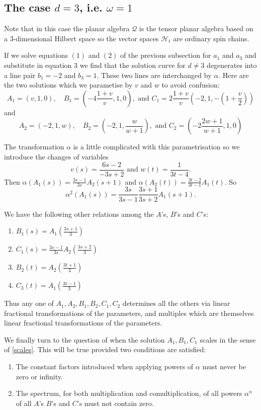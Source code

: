 \documentclass[11pt]{amsart}
\newcommand{\1}{\mathcal I}
\newcommand{\5}{\vskip 5pt}
\begin{document}
\subsection{The case $d=3$, i.e.  $\omega=1$}  Note that in this case the planar algebra $\mathcal Q$ is the tensor
planar algebra based on a 3-dimensional Hilbert space so the vector spaces $\mathcal H_t$ are ordinary spin chains.

If we solve equations $(1)$ and $(2)$ of the previous subsection for $a_1$ and $a_3$ and substitute in equation $3$ we
find that the solution curve for $d\neq 3$ degenerates into a line pair $b_1=-2$ and $b_3=1$. These two lines are 
interchanged by $\alpha$. Here are the two solutions which we parametise by $v$ and $w$ to avoid confusion:\\
$$A_1=(v,1,0),\quad B_1=(-4\frac{1+v}{v},1,0), \mbox{    and    } C_1=2\frac{1+v}{v}(-2,1,-(1+\frac{v}{2}))$$
and
$$A_2=(-2,1,w),\quad B_2=(-2,1,\frac{w}{w+1}), \mbox{    and    } C_2=(-2\frac{2w+1}{w+1},1,0)$$

The transformation $\alpha$ is a little complicated with this parametrisation so we introduce the changes of 
variables $$v(s)=\frac{6s-2}{-3s+2}\mbox{  and  } w(t)=\frac{1}{3t-4}.$$
Then $\displaystyle \alpha(A_1(s))=\frac{3s-1}{3s}A_2(s+1)$ and $\displaystyle \alpha(A_2(t))=\frac{3t-2}{3t-1}A_1(t)$.
So $$\alpha^2(A_1(s))=\frac{3s}{3s-1}\frac{3s+1}{3s+2}A_1(s+1).$$

We have the following other relations among the $A$'s, $B$'s and $C$'s:

\begin{enumerate}
\item $\displaystyle B_1(s)=A_1(\frac{3s+1}{3})$
\5
\item $\displaystyle C_1(s)=\frac{3s-1}{3s}A_2(\frac{3s+2}{3})$
\5
\item $\displaystyle B_2(t)=A_2(\frac{3t+1}{3})$
\5
\item $\displaystyle C_3(t)=A_1(\frac{3t-1}{3})$
\end{enumerate}

Thus any one of $A_1,A_2,B_1,B_2,C_1,C_2$ determines all the others via linear fractional transformations of
the parameters, and multiples which are themselves linear fractional transformations of the parameters. 

We finally turn to the question of when the solution $A_1,B_1,C_1$ scales in the sense of
\ref{scales}. This will be true provided two conditions are satisfied:
\begin{enumerate}
\item The constant factors introduced when applying powers of $\alpha$ must never be zero or infinity.
\item  The spectrum, for both multiplication and comultiplication, of all powers $\alpha^n$ of all $A$'s $B$'s and $C$'s
must not contain zero.
\end{enumerate}
\end{document}
